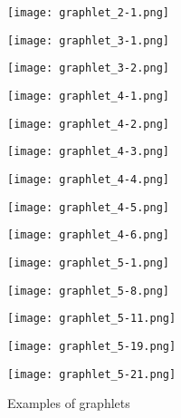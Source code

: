 \begin{figure}[th]
\begin{center}
\hspace*{\fill}
  \texttt{[image: graphlet\_2-1.png]}\vspace{-.3cm}
  \caption*{$H_1^{(2)}$}
\endminipage\hfill
{}
  \texttt{[image: graphlet\_3-1.png]}\vspace{-.3cm}
  \caption*{$H_1^{(3)}$}
\endminipage\hfill
{}
  \texttt{[image: graphlet\_3-2.png]}\vspace{-.3cm}
  \caption*{$H_2^{(3)}$}
\endminipage
\hspace*{\fill}
\vskip 5pt
\hspace*{\fill}
%
  \texttt{[image: graphlet\_4-1.png]}\vspace{-.3cm}
  \caption*{$H_1^{(4)}$}
\endminipage\hfill
{}
  \texttt{[image: graphlet\_4-2.png]}\vspace{-.3cm}
  \caption*{$H_2^{(4)}$}
\endminipage\hfill
{}
  \texttt{[image: graphlet\_4-3.png]}\vspace{-.3cm}
  \caption*{$H_3^{(4)}$}
\endminipage\hfill
{}
  \texttt{[image: graphlet\_4-4.png]}\vspace{-.3cm}
  \caption*{$H_4^{(4)}$}
\endminipage\hfill
{}%
  \texttt{[image: graphlet\_4-5.png]}\vspace{-.3cm}
  \caption*{$H_5^{(4)}$}
\endminipage\hspace*{\fill}
%
  \texttt{[image: graphlet\_4-6.png]}\vspace{-.3cm}
  \caption*{$H_6^{(4)}$}
\endminipage
\hspace*{\fill}
\vskip 5pt
\hspace*{\fill}
%
  \texttt{[image: graphlet\_5-1.png]}\vspace{-.3cm}
  \caption*{$H_1^{(5)}$}
\endminipage\hfill
{}
  \texttt{[image: graphlet\_5-8.png]}\vspace{-.3cm}
  \caption*{$H_8^{(5)}$}
\endminipage\hfill
{}
  \texttt{[image: graphlet\_5-11.png]}\vspace{-.3cm}
  \caption*{$H_{11}^{(5)}$}
\endminipage\hfill
{}
  \texttt{[image: graphlet\_5-19.png]}\vspace{-.3cm}
  \caption*{$H_{19}^{(5)}$}
\endminipage\hfill
{}%
  \texttt{[image: graphlet\_5-21.png]}\vspace{-.3cm}
  \caption*{$H_{21}^{(5)}$}
\endminipage\hspace*{\fill}
\vspace{-.1cm}
\caption{Examples of graphlets}
\vspace{-.1cm}
\label{fig:graphlets}
\end{center}
\end{figure}

